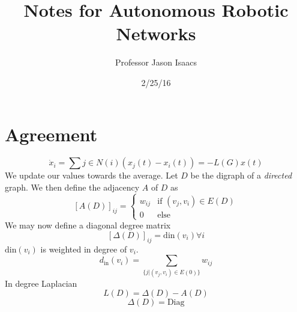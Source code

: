 \documentclass{article}
\title{Notes for Autonomous Robotic Networks}
\author{Professor Jason Isaacs}
\date{2/25/16}
\begin{document}
\maketitle
\section{Agreement}
\[ \dot{x}_i = \sum{j\in N(i)} (x_j(t) - x_i(t)) = -L(G)x(t) \]
We update our values towards the average. Let $D$ be the digraph of a
\emph{directed} graph. We then define the adjacency $A$ of $D$ as
\[ {[A(D)]}_{ij} = \begin{cases} w_{ij} & \text{if } (v_j, v_i) \in
E(D) \\
0 & \text{else } \end{cases} \]
We may now define a diagonal degree matrix
\[ [\Delta(D)]_{ij} = \text{din}(v_i) \forall i \]
$\text{din}(v_i)$ is weighted in degree of $v_i$. 
\[ d_{\text{in}}(v_i) = \sum_{\{j|(v_j, v_i) \in E(0)\}} w_{ij} \]
In degree Laplacian
\[ L(D) = \Delta(D) - A(D) \]
\[ \Delta(D) = \text{Diag} \]
\end{document}
